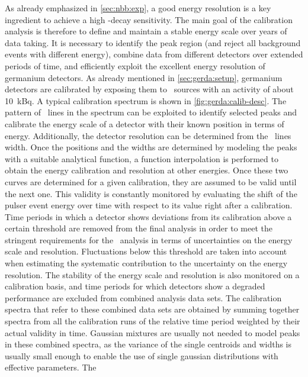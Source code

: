 As already emphasized in \cref{sec:nbb:exp}, a good energy resolution is a key ingredient
to achieve a high \onbb-decay sensitivity. The main goal of the calibration analysis is
therefore to define and maintain a stable energy scale over years of data taking.  It
is necessary to identify the peak region (and reject all background events with
different energy), combine data from different detectors over extended periods of time,
and efficiently exploit the excellent energy resolution of germanium detectors.
\newpar
As already mentioned in \cref{sec:gerda:setup}, germanium detectors are calibrated by
exposing them to \Th\ sources with an activity of about 10~kBq. A typical calibration
spectrum is shown in \cref{fig:gerda:calib-desc}. The pattern of \g\ lines in the spectrum
can be exploited to identify selected peaks and calibrate the energy scale of a detector
with their known position in terms of energy. Additionally, the detector resolution can be
determined from the \g\ lines width. Once the positions and the widths are determined by
modeling the peaks with a suitable analytical function, a function interpolation is
performed to obtain the energy calibration and resolution at other energies. Once these
two curves are determined for a given calibration, they are assumed to be valid until the
next one. This validity is constantly monitored by evaluating the shift of the pulser
event energy over time with respect to its value right after a calibration. Time periods
in which a detector shows deviations from its calibration above a certain threshold are
removed from the final analysis in order to meet the stringent requirements for the \onbb\
analysis in terms of uncertainties on the energy scale and resolution. Fluctuations below
this threshold are taken into account when estimating the systematic contribution to the
uncertainty on the energy resolution. The stability of the energy scale and resolution is
also monitored on a calibration basis, and time periods for which detectors show a
degraded performance are excluded from combined analysis data sets.  The calibration
spectra that refer to these combined data sets are obtained by summing together spectra
from all the calibration runs of the relative time period weighted by their actual
validity in time.  Gaussian mixtures are usually not needed to model peaks in these
combined spectra, as the variance of the single centroids and widths is usually small
enough to enable the use of single gaussian distributions with effective parameters. The
